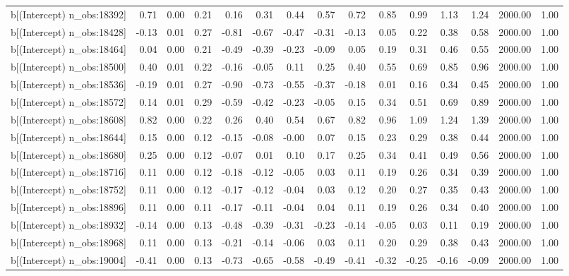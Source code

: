 \begin{table}[ht]
\begin{tabular}{rrrrrrrrrrrrrrr}
  b[(Intercept) n\_obs:18392] & 0.71 & 0.00 & 0.21 & 0.16 & 0.31 & 0.44 & 0.57 & 0.72 & 0.85 & 0.99 & 1.13 & 1.24 & 2000.00 & 1.00 \\ 
  b[(Intercept) n\_obs:18428] & -0.13 & 0.01 & 0.27 & -0.81 & -0.67 & -0.47 & -0.31 & -0.13 & 0.05 & 0.22 & 0.38 & 0.58 & 2000.00 & 1.00 \\ 
  b[(Intercept) n\_obs:18464] & 0.04 & 0.00 & 0.21 & -0.49 & -0.39 & -0.23 & -0.09 & 0.05 & 0.19 & 0.31 & 0.46 & 0.55 & 2000.00 & 1.00 \\ 
  b[(Intercept) n\_obs:18500] & 0.40 & 0.01 & 0.22 & -0.16 & -0.05 & 0.11 & 0.25 & 0.40 & 0.55 & 0.69 & 0.85 & 0.96 & 2000.00 & 1.00 \\ 
  b[(Intercept) n\_obs:18536] & -0.19 & 0.01 & 0.27 & -0.90 & -0.73 & -0.55 & -0.37 & -0.18 & 0.01 & 0.16 & 0.34 & 0.45 & 2000.00 & 1.00 \\ 
  b[(Intercept) n\_obs:18572] & 0.14 & 0.01 & 0.29 & -0.59 & -0.42 & -0.23 & -0.05 & 0.15 & 0.34 & 0.51 & 0.69 & 0.89 & 2000.00 & 1.00 \\ 
  b[(Intercept) n\_obs:18608] & 0.82 & 0.00 & 0.22 & 0.26 & 0.40 & 0.54 & 0.67 & 0.82 & 0.96 & 1.09 & 1.24 & 1.39 & 2000.00 & 1.00 \\ 
  b[(Intercept) n\_obs:18644] & 0.15 & 0.00 & 0.12 & -0.15 & -0.08 & -0.00 & 0.07 & 0.15 & 0.23 & 0.29 & 0.38 & 0.44 & 2000.00 & 1.00 \\ 
  b[(Intercept) n\_obs:18680] & 0.25 & 0.00 & 0.12 & -0.07 & 0.01 & 0.10 & 0.17 & 0.25 & 0.34 & 0.41 & 0.49 & 0.56 & 2000.00 & 1.00 \\ 
  b[(Intercept) n\_obs:18716] & 0.11 & 0.00 & 0.12 & -0.18 & -0.12 & -0.05 & 0.03 & 0.11 & 0.19 & 0.26 & 0.34 & 0.39 & 2000.00 & 1.00 \\ 
  b[(Intercept) n\_obs:18752] & 0.11 & 0.00 & 0.12 & -0.17 & -0.12 & -0.04 & 0.03 & 0.12 & 0.20 & 0.27 & 0.35 & 0.43 & 2000.00 & 1.00 \\ 
  b[(Intercept) n\_obs:18896] & 0.11 & 0.00 & 0.11 & -0.17 & -0.11 & -0.04 & 0.04 & 0.11 & 0.19 & 0.26 & 0.34 & 0.40 & 2000.00 & 1.00 \\ 
  b[(Intercept) n\_obs:18932] & -0.14 & 0.00 & 0.13 & -0.48 & -0.39 & -0.31 & -0.23 & -0.14 & -0.05 & 0.03 & 0.11 & 0.19 & 2000.00 & 1.00 \\ 
  b[(Intercept) n\_obs:18968] & 0.11 & 0.00 & 0.13 & -0.21 & -0.14 & -0.06 & 0.03 & 0.11 & 0.20 & 0.29 & 0.38 & 0.43 & 2000.00 & 1.00 \\ 
  b[(Intercept) n\_obs:19004] & -0.41 & 0.00 & 0.13 & -0.73 & -0.65 & -0.58 & -0.49 & -0.41 & -0.32 & -0.25 & -0.16 & -0.09 & 2000.00 & 1.00 \\ 

\end{tabular}
\end{table}
